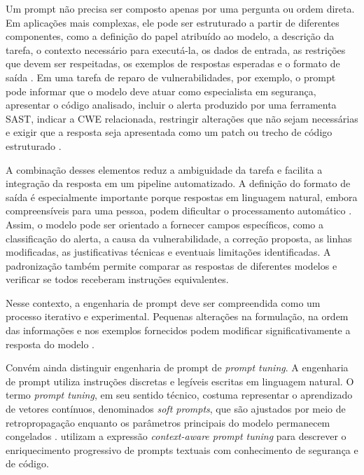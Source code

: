 Um prompt não precisa ser composto apenas por uma pergunta ou ordem direta. Em aplicações mais complexas, ele pode ser estruturado a partir de diferentes componentes, como a definição do papel atribuído ao modelo, a descrição da tarefa, o contexto necessário para executá-la, os dados de entrada, as restrições que devem ser respeitadas, os exemplos de respostas esperadas e o formato de saída \cite{reynolds_prompt_2021}. Em uma tarefa de reparo de vulnerabilidades, por exemplo, o prompt pode informar que o modelo deve atuar como especialista em segurança, apresentar o código analisado, incluir o alerta produzido por uma ferramenta SAST, indicar a CWE relacionada, restringir alterações que não sejam necessárias e exigir que a resposta seja apresentada como um patch ou trecho de código estruturado \cite{khan_code_2025}.

A combinação desses elementos reduz a ambiguidade da tarefa e facilita a integração da resposta em um pipeline automatizado. A definição do formato de saída é especialmente importante porque respostas em linguagem natural, embora compreensíveis para uma pessoa, podem dificultar o processamento automático \cite{liu_we_2024}. Assim, o modelo pode ser orientado a fornecer campos específicos, como a classificação do alerta, a causa da vulnerabilidade, a correção proposta, as linhas modificadas, as justificativas técnicas e eventuais limitações identificadas. A padronização também permite comparar as respostas de diferentes modelos e verificar se todos receberam instruções equivalentes.

Nesse contexto, a engenharia de prompt deve ser compreendida como um processo iterativo e experimental. Pequenas alterações na formulação, na ordem das informações e nos exemplos fornecidos podem modificar significativamente a resposta do modelo \cite{lu_fantastically_2022}.

Convém ainda distinguir engenharia de prompt de \textit{prompt tuning}. A engenharia de prompt utiliza instruções discretas e legíveis escritas em linguagem natural. O termo \textit{prompt tuning}, em seu sentido técnico, costuma representar o aprendizado de vetores contínuos, denominados \textit{soft prompts}, que são ajustados por meio de retropropagação enquanto os parâmetros principais do modelo permanecem congelados \cite{lester_power_2021}.  utilizam a expressão \textit{context-aware prompt tuning} para descrever o enriquecimento progressivo de prompts textuais com conhecimento de segurança e de código.

